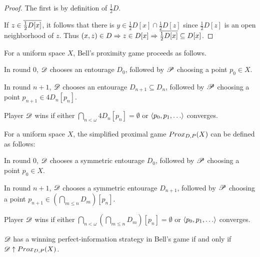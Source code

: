 \begin{proof}
  The first is by definition of $\frac{1}{2}D$.

  If $z\in \overline{\frac{1}{2}D[x]}$, it follows that there is $y\in \frac{1}{2}D[x]\cap\frac{1}{2}D[z]$ since $\frac{1}{2}D[z]$ is an open neighborhood of $z$. Thus $(x,z)\in D \Rightarrow z\in D[x] \Rightarrow \overline{\frac{1}{2}D[x]}\subseteq D[x]$.
\end{proof}

\begin{definition}
  For a uniform space $X$, Bell's proximity game proceeds as follows. 

  In round $0$, $\mathscr{D}$ chooses an entourage $D_0$, followed by $\mathscr{P}$ choosing a point $p_0\in X$. 

  In round $n+1$, $\mathscr{D}$ chooses an entourage $D_{n+1}\subseteq D_n$, followed by $\mathscr{P}$ choosing a point $p_{n+1}\in 4D_n[p_n]$.

  Player $\mathscr{D}$ wins if either $\bigcap_{n<\omega} 4D_n[p_n] = \emptyset$ or $\<p_0,p_1,\dots\>$ converges.
\end{definition}

\begin{definition}
  For a uniform space $X$, the simplified proximal game $Prox_{D,P}(X)$ can be defined as follows:

  In round $0$, $\mathscr{D}$ chooses a symmetric entourage $D_0$, followed by $\mathscr{P}$ choosing a point $p_0\in X$. 

  In round $n+1$, $\mathscr{D}$ chooses a symmetric entourage $D_{n+1}$, followed by $\mathscr{P}$ choosing a point $p_{n+1}\in\left(\bigcap_{m\leq n}D_m\right)[p_n]$.

  Player $\mathscr{D}$ wins if either $\bigcap_{n<\omega}\left(\bigcap_{m\leq n} D_m\right)[p_n]=\emptyset$ or $\<p_0,p_1,\dots\>$ converges.
\end{definition}

\begin{theorem}
  $\mathscr{D}$ has a winning perfect-information strategy in Bell's game if and only if $\mathscr{D}\uparrow Prox_{D,P}(X)$.
\end{theorem}


